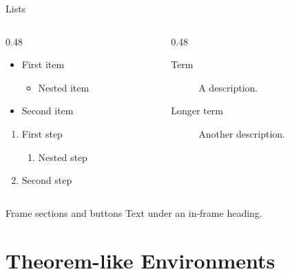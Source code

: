 \documentclass[aspectratio=169]{beamer}
\begin{document}
\begin{frame}{Lists}
  \begin{columns}[T]
    \begin{column}{0.48\textwidth}
      \begin{itemize}
        \item First item
        \begin{itemize}
          \item Nested item
        \end{itemize}
        \item Second item
      \end{itemize}
      \begin{enumerate}
        \item First step
        \begin{enumerate}
          \item Nested step
        \end{enumerate}
        \item Second step
      \end{enumerate}
    \end{column}
    \begin{column}{0.48\textwidth}
      \begin{description}
        \item[Term] A description.
        \item[Longer term] Another description.
      \end{description}
    \end{column}
  \end{columns}
\end{frame}

\begin{frame}{Frame sections and buttons}
  Text under an in-frame heading.

  \medskip
  \quad
  \hyperlink{palette}{}\quad
  \quad
\end{frame}

\section{Theorem-like Environments}
\sepframe
\end{document}
